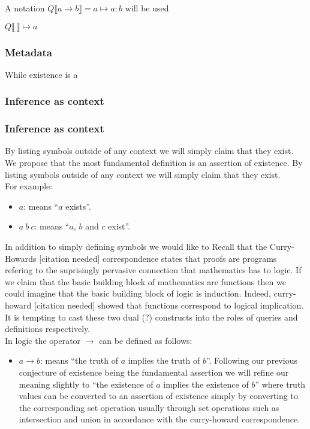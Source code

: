 \documentclass[11pt]{article}
\begin{document}
A notation $Q\llbracket a \rightarrow b \rrbracket = a \mapsto a:b$ will be used

$Q\llbracket \ \rrbracket \mapsto a$


\subsubsection{Metadata}
While existence is a 

\subsubsection{Inference as context}



\subsubsection{Inference as context}
By listing symbols outside of any context we will simply claim that they exist.\\




We propose that the most fundamental definition is an assertion of existence. By listing symbols outside of any context we will simply claim that they exist.\\
For example:
\begin{itemize}
\item $a$: means ``$a$ exists''.
\item $a\ b\ c$: means ``$a$, $b$ and $c$ exist''.
\end{itemize}

In addition to simply defining symbols we would like to 
Recall that the Curry-Howards [citation needed] correspondence states that proofs are programs refering to the suprisingly pervasive connection that mathematics has to logic.
If we claim that the basic building block of mathematics are functions then we could imagine that the basic building block of logic is induction.
Indeed, curry-howard [citation needed] showed that functions correspond to logical implication. 
It is tempting to cast these two dual (?) constructs into the roles of queries and definitions respectively.\\

In logic the operator $\rightarrow$ can be defined as follows:
\begin{itemize}
\item $a \rightarrow b$: means ``the truth of $a$ implies the truth of $b$''. 
Following our previous conjecture of existence being the fundamental assertion we will refine our meaning slightly to ``the existence of $a$ implies the existence of $b$'' where truth values 
can be converted to an assertion of existence simply by converting to the corresponding set operation usually through set operations such as intersection and union in accordance with the curry-howard correspondence.
\end{itemize}
\end{document}
